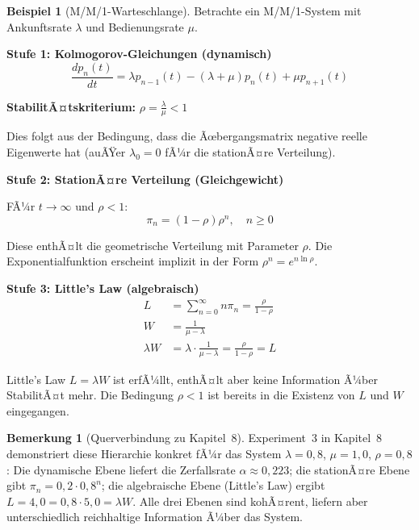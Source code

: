 ﻿\documentclass[a4paper,12pt]{report}
\theoremstyle{definition}
\newtheorem{bemerkung}{Bemerkung}[section]
\newtheorem{beispiel}{Beispiel}[section]
\begin{document}
\begin{beispiel}[M/M/1-Warteschlange]
	Betrachte ein M/M/1-System mit Ankunftsrate $\lambda$ und Bedienungsrate $\mu$.
	
	\textbf{Stufe 1: Kolmogorov-Gleichungen (dynamisch)}
	\begin{equation}
		\frac{dp_n(t)}{dt} = \lambda p_{n-1}(t) - (\lambda + \mu) p_n(t) + \mu p_{n+1}(t)
	\end{equation}
	
	\textbf{StabilitÃ¤tskriterium:} $\rho = \frac{\lambda}{\mu} < 1$
	
	Dies folgt aus der Bedingung, dass die Ãœbergangsmatrix negative reelle Eigenwerte hat (auÃŸer $\lambda_0 = 0$ fÃ¼r die stationÃ¤re Verteilung).
	
	\textbf{Stufe 2: StationÃ¤re Verteilung (Gleichgewicht)}
	
	FÃ¼r $t \to \infty$ und $\rho < 1$:
	\begin{equation}
		\pi_n = (1-\rho) \rho^n, \quad n \geq 0
	\end{equation}
	
	Diese enthÃ¤lt die geometrische Verteilung mit Parameter $\rho$. Die Exponentialfunktion erscheint implizit in der Form $\rho^n = e^{n \ln \rho}$.
	
	\textbf{Stufe 3: Little's Law (algebraisch)}
	\begin{align}
		L &= \sum_{n=0}^{\infty} n \pi_n = \frac{\rho}{1-\rho} \\
		W &= \frac{1}{\mu - \lambda} \\
		\lambda W &= \lambda \cdot \frac{1}{\mu - \lambda} = \frac{\rho}{1-\rho} = L
	\end{align}
	
	Little's Law $L = \lambda W$ ist erfÃ¼llt, enthÃ¤lt aber keine Information
	Ã¼ber StabilitÃ¤t mehr.  Die Bedingung $\rho < 1$ ist bereits in die Existenz
	von $L$ und $W$ eingegangen.
	
	\begin{bemerkung}[Querverbindung zu Kapitel~8]
		Experiment~3 in Kapitel~8 demonstriert diese Hierarchie konkret fÃ¼r das
		System $\lambda = 0{,}8$, $\mu = 1{,}0$, $\rho = 0{,}8$: Die
		dynamische Ebene liefert die Zerfallsrate $\alpha \approx 0{,}223$;
		die stationÃ¤re Ebene gibt $\pi_n = 0{,}2 \cdot 0{,}8^n$; die
		algebraische Ebene (Little's Law) ergibt $L = 4{,}0 = 0{,}8 \cdot 5{,}0 = \lambda W$.
		Alle drei Ebenen sind kohÃ¤rent, liefern aber unterschiedlich reichhaltige
		Information Ã¼ber das System.
	\end{bemerkung}
\end{beispiel}
\end{document}
